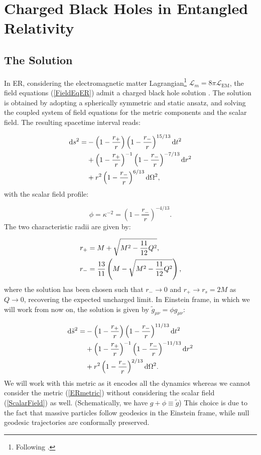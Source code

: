 \documentclass[floats,floatfix,aps, preprintnumbers,nofootinbib]{revtex4-2}
\newcommand{\paren}[1]{\left( #1 \right)}
\newcommand{\mrm}{\mathrm}
\newcommand{\mcal}{\mathcal}
\begin{document}


\section{Charged Black Holes in Entangled Relativity}
\label{sec:CBER}

\subsection{The Solution}

In ER, considering the electromagnetic matter Lagrangian\footnote{Following \cite{Wavasseur2025}.} $\mcal L_m = 8\pi \mcal L_{\mrm{EM}}$, the field equations (\ref{FieldEqER}) admit a charged black hole solution \cite{Wavasseur2025}. The solution is obtained by adopting a spherically symmetric and static ansatz, and solving the coupled system of field equations for the metric components and the scalar field. The resulting spacetime interval reads:

\begin{align}\label{ERmetric}
    \mrm ds^2 = &-\paren{1-\frac{r_+}{r}}\paren{1 - \frac{r_-}{r}}^{15/13}\mrm dt^2\notag\\
    &+\paren{1 - \frac{r_+}{r}}^{-1}\paren{1 - \frac{r_-}{r}}^{-7/13}\mrm dr^2\notag\\
    &+ r^2\paren{1 - \frac{r_-}{r}}^{6/13}\mrm d\Omega^2,
\end{align}
with the scalar field profile:

\begin{equation}\label{ScalarField}
    \phi = \kappa^{-2} = \paren{1 - \frac{r_-}{r}}^{-4/13}.
\end{equation}
The two characteristic radii are given by:

\begin{align}
    r_+ &= M + \sqrt{M^2 - \frac{11}{12}Q^2}, \notag \\
    r_- &= \frac{13}{11}\left(M - \sqrt{M^2 - \frac{11}{12}Q^2}\right),
    \label{HorizonsER}
\end{align}
where the solution has been chosen such that $r_- \to 0$ and $r_+ \to r_s = 2M$ as $Q \to 0$, recovering the expected uncharged limit. In Einstein frame, in which we will work from now on, the solution is given by $\tilde g_{\mu\nu} = \phi g_{\mu\nu}$:

\begin{align}\label{ERmetric-Einstein}
    \mrm d\tilde s^2 = &-\paren{1-\frac{r_+}{r}}\paren{1 - \frac{r_-}{r}}^{11/13}\mrm dt^2\notag\\
    &+\paren{1 - \frac{r_+}{r}}^{-1}\paren{1 - \frac{r_-}{r}}^{-11/13}\mrm dr^2\notag\\
    &+ r^2\paren{1 - \frac{r_-}{r}}^{2/13}\mrm d\Omega^2.
\end{align}
We will work with this metric as it encodes all the dynamics whereas we cannot consider the metric (\ref{ERmetric}) without considering the scalar field (\ref{ScalarField}) as well. (Schematically, we have $g + \phi \equiv \tilde g$) This choice is due to the fact that massive particles follow geodesics in the Einstein frame, while null geodesic trajectories are conformally preserved.
\end{document}
